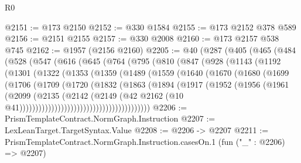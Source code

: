 \begin{lexlean}{R0}
\begin{coremodule}
@2151 := @173 @2150
@2152 := @330 @1584
@2155 := @173 @2152 @378 @589
@2156 := @2151 @2155
@2157 := @330 @2008
@2160 := @173 @2157 @538 @745
@2162 := @1957 (@2156 @2160)
@2205 := @40
    (@287
      (@405
        (@465
          (@484
            (@528
              (@547
                (@616
                  (@645
                    (@764
                      (@795
                        (@810
                          (@847
                            (@928
                              (@1143
                                (@1192
                                  (@1301
                                    (@1322
                                      (@1353
                                        (@1359
                                          (@1489
                                            (@1559
                                              (@1640
                                                (@1670
                                                  (@1680
                                                    (@1699
                                                      (@1706
                                                        (@1709
                                                          (@1720
                                                            (@1832
                                                              (@1863
                                                                (@1894
                                                                  (@1917
                                                                    (@1952
                                                                      (@1956
                                                                        (@1961
                                                                          (@2099
                                                                            (@2135
                                                                              (@2142
                                                                                (@2149
                                                                                  (@42
                                                                                    @2162
                                                                                    (@10
                                                                                      @41)))))))))))))))))))))))))))))))))))))))))
@2206 := PrismTemplateContract.NormGraph.Instruction
@2207 := LexLeanTarget.TargetSyntax.Value
@2208 := @2206 -> @2207
@2211 := PrismTemplateContract.NormGraph.Instruction.casesOn.{1} (fun ("_" : @2206) => @2207)

\end{coremodule}
\end{lexlean}
